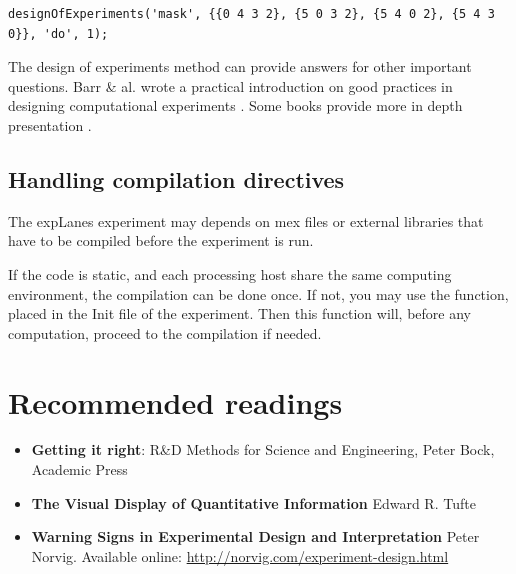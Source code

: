 \documentclass[a4paper,fleqn]{tufte-handout}
\newcommand{\explanes}{\textsf{expLanes} }
\begin{document}
\begin{lstlisting}
designOfExperiments('mask', {{0 4 3 2}, {5 0 3 2}, {5 4 0 2}, {5 4 3 0}}, 'do', 1);
\end{lstlisting}

The design of experiments method can provide answers for other important questions. Barr \& al.  wrote a practical introduction on good practices in designing computational experiments \cite{design}. Some books provide more in depth presentation \cite{de,se}.




\subsection{Handling compilation directives}

The \explanes experiment may depends on mex files or external libraries that have to be compiled before the experiment is run.

If the code is static, and each processing host share the same computing environment, the compilation can be done once. If not, you may use the  function, placed in the Init file of the experiment. Then this function will, before any computation, proceed to the compilation if needed.

%
%
%
%
%
%
%
%
%
%
%
%
%

\section{Recommended readings}

\begin{itemize}

\item \textbf{Getting it right}: R\&D Methods for Science and Engineering, Peter Bock, Academic Press

\item \textbf{The Visual Display of Quantitative Information} Edward R. Tufte

\item \textbf{Warning Signs in Experimental Design and Interpretation} Peter Norvig.  Available online: \url{http://norvig.com/experiment-design.html}

\end{itemize}



\end{document}
